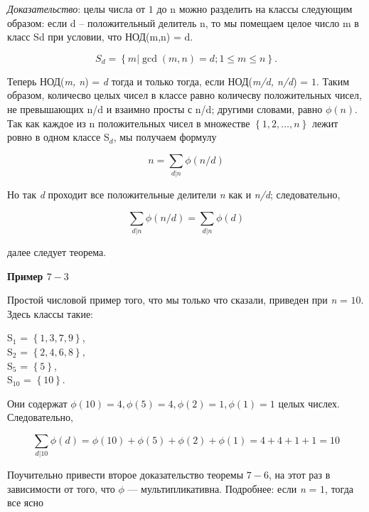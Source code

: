 \documentclass[11pt]{article}
\begin{document}
\textit{Доказательство}: целы числа от $1$ до n можно разделить на классы следующим образом: если d – положительный делитель n, то мы помещаем целое число m в класс Sd при условии, что НОД(m,n) = d.

\[
S_{d} = \left\{m | \gcd(m, n) = d; 1 \leq m \leq n\right\}.	
\]


Теперь НОД(\textit{m, n}) = \textit{d} тогда и только тогда, если  НОД(\textit{m/d, n/d}) = $1$. Таким образом, количесво целых чисел в классе равно количесву положительных чисел, не превышающих  n/d и взаимно просты с n/d; другими словами, равно $\phi(n)$. Так как каждое из n положительных чисел в множестве $\left\{1, 2, … , n\right\}$ лежит ровно в одном классе S$_d$, мы получаем формулу

\[
n = \sum_{d|n}\phi(n/d)
\]


Но так \textit{d} проходит все положительные делители \textit{n} как и \textit{n/d}; следовательно, 

\[
\sum_{d|n}\phi(\textit{n/d}) = \sum_{d|n}\phi(\textit{d})
\]

далее следует теорема.

\begin{flushleft}
	\textbf{Пример $7-3$}
\end{flushleft}


Простой числовой пример того, что мы только что сказали, приведен при \textit{n} = $10$. Здесь классы такие:

\begin{center}

	 S$_1$  = $\left\{1, 3, 7, 9\right\}$,\\
	
	 S$_2$ = $\left\{2, 4, 6, 8\right\}$,\\
	
	 S$_5$ = $\left\{5\right\}$,\\
	
	 S$_{10}$ = $\left\{10\right\}$.
	
\end{center}				


Они содержат $\phi(10) = 4, \phi(5) = 4, \phi(2) = 1, \phi(1) = 1$ целых числех. Следовательно, 

\[
	\sum_{d|10}\phi(\textit{d}) = \phi(10) + \phi(5) + \phi(2) + \phi(1) = 4 + 4 + 1 + 1 = 10
\]

Поучительно привести второе доказательство теоремы $7-6$, на этот раз в зависимости от того, что  $\phi$ — мультипликативна. Подробнее: если \textit{n} = $1$,  тогда все ясно 
\end{document}
